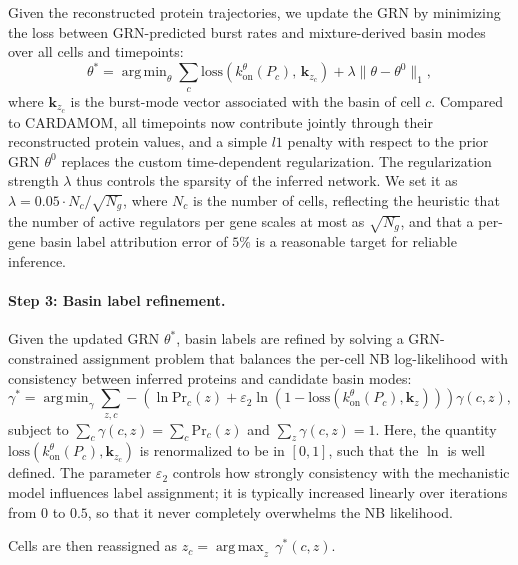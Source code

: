 \documentclass[a4paper, 11pt]{article}
\DeclareMathOperator*{\argmin}{arg\,min}
\DeclareMathOperator*{\argmax}{arg\,max}
\theoremstyle{plain}
\theoremstyle{remark}
\begin{document}
Given the reconstructed protein trajectories, we update the GRN by minimizing the loss between GRN-predicted burst rates and mixture-derived basin modes over all cells and timepoints:
\begin{equation}
\label{eq:GRN_update}
\theta^{\ast}
   = \argmin_{\theta}
      \sum_{c}
      \mathrm{loss}\!\left(k^{\theta}_{\mathrm{on}}(P_c),\, \mathbf{k}_{z_c}\right)
      + \lambda \|\theta - \theta^0\|_1,
\end{equation}
where $\mathbf{k}_{z_c}$ is the burst-mode vector associated with the basin of cell $c$. Compared to CARDAMOM, all timepoints now contribute jointly through their reconstructed protein values, and a simple $l1$ penalty with respect to the prior GRN $\theta^0$ replaces the custom time-dependent regularization. The regularization strength $\lambda$ thus controls the sparsity of the inferred network. We set it as $\lambda = 0.05 \cdot {N_c}/\sqrt{N_g}$, where $N_c$ is the number of cells,
reflecting the heuristic that the number of active regulators per gene scales at most as $\sqrt{N_g}$, and that a per-gene basin label attribution error of $5\%$ is a reasonable target for reliable inference.

\paragraph{Step 3: Basin label refinement.}

Given the updated GRN $\theta^*$, basin labels are refined by solving a GRN-constrained assignment problem that balances the per-cell NB log-likelihood with consistency between inferred proteins and candidate basin modes:
\begin{equation}
\label{eq:basins_update}
\gamma^* = \argmin_{\gamma}\sum_{z,c}
      -\!\left(\ln\mathrm{Pr}_c(z)
       + \varepsilon_2\ln\!\left(1 - \mathrm{loss}\!\left(k^{\theta}_{\mathrm{on}}(P_c),\mathbf{k}_{z}\right)\right)\right)\gamma(c,z),
\end{equation}
subject to $\sum_c\gamma(c,z) = \sum_c\mathrm{Pr}_c(z)$ and $\sum_z\gamma(c,z) = 1$. Here, the quantity $\mathrm{loss}\!\left(k^{\theta}_{\mathrm{on}}(P_c),\mathbf{k}_{z_c}\right)$ is renormalized to be in $[0, 1]$, such that the $\ln$ is well defined. The parameter $\varepsilon_2$ controls how strongly consistency with the mechanistic model influences label assignment; it is typically increased linearly over iterations from $0$ to $0.5$, so that it never completely overwhelms the NB likelihood.

Cells are then reassigned as $z_c = \argmax_z\,\gamma^*(c,z)$.
\end{document}
